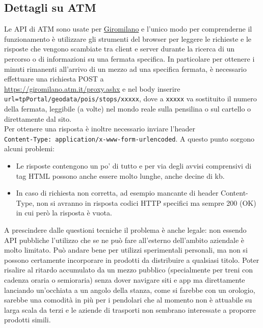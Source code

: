 \documentclass[12pt,a4paper]{report}
\begin{document}
\subsection{Dettagli su ATM}
Le API di ATM sono usate per \href{https://giromilano.atm.it}{Giromilano} e l'unico modo per comprenderne il funzionamento è utilizzare
gli strumenti del browser per leggere le richieste e le risposte che vengono scambiate tra client e server durante la ricerca di un
percorso o di informazioni su una fermata specifica.
In particolare per ottenere i minuti rimanenti all'arrivo di un mezzo ad una specifica fermata, è necessario effettuare una richiesta
POST a\\ \url{https://giromilano.atm.it/proxy.ashx} e nel body inserire\\ \texttt{url=tpPortal/geodata/pois/stops/xxxxx}, dove a
\texttt{xxxxx} va sostituito il numero della fermata, leggibile (a volte) nel mondo reale sulla pensilina o sul cartello o direttamente
dal sito.\\
Per ottenere una risposta è inoltre necessario inviare l'header\\ \texttt{Content-Type: application/x-www-form-urlencoded}.
A questo punto sorgono alcuni problemi:
\begin{itemize}
  \item Le risposte contengono un po' di tutto e per via degli avvisi comprensivi di tag HTML possono anche essere molto lunghe, anche
        decine di kb.
  \item In caso di richiesta non corretta, ad esempio mancante di header Content-Type, non si avranno in risposta codici HTTP specifici
        ma sempre 200 (OK) in cui però la risposta è vuota.
\end{itemize}

A prescindere dalle questioni tecniche il problema è anche legale: non essendo API pubbliche l'utilizzo che se ne può fare all'esterno
dell'ambito aziendale è molto limitato. Può andare bene per utilizzi sperimentali personali, ma non si possono certamente incorporare
in prodotti da distribuire a qualsiasi titolo.
Poter risalire al ritardo accumulato da un mezzo pubblico (specialmente per treni con cadenza oraria o semioraria) senza dover navigare
siti e app ma direttamente lanciando un'occhiata a un angolo della stanza, come si farebbe con un orologio, sarebbe una comodità in più
per i pendolari che al momento non è attuabile su larga scala da terzi e le aziende di trasporti non sembrano interessate a proporre
prodotti simili.





\end{document}
